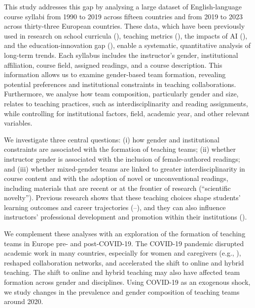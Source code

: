 \documentclass[
  british,
  12pt, %
]{article}
\begin{document}
This study addresses this gap by analysing a large dataset of English-language course syllabi from 1990 to 2019 across fifteen countries and from 2019 to 2023 across thirty-three European countries. These data, which have been previously used in research on school curricula (), teaching metrics (), the impacts of AI (), and the education-innovation gap (), enable a systematic, quantitative analysis of long-term trends. Each syllabus includes the instructor's gender, institutional affiliation, course field, assigned readings, and a course description. This information allows us to examine gender-based team formation, revealing potential preferences and institutional constraints in teaching collaborations. Furthermore, we analyse how team composition, particularly gender and size, relates to teaching practices, such as interdisciplinarity and reading assignments, while controlling for institutional factors, field, academic year, and other relevant variables.

We investigate three central questions: (i) how gender and institutional constraints are associated with the formation of teaching teams; (ii) whether instructor gender is associated with the inclusion of female-authored readings; and (iii) whether mixed-gender teams are linked to greater interdisciplinarity in course content and with the adoption of novel or unconventional readings, including materials that are recent or at the frontier of research (``scientific novelty''). Previous research shows that these teaching choices shape students' learning outcomes and career trajectories (--), and they can also influence instructors' professional development and promotion within their institutions ().

We complement these analyses with an exploration of the formation of teaching teams in Europe pre- and post-COVID-19. The COVID-19 pandemic disrupted academic work in many countries, especially for women and caregivers (e.g., ), reshaped collaboration networks, and accelerated the shift to online and hybrid teaching. The shift to online and hybrid teaching may also have affected team formation across gender and disciplines. Using COVID-19 as an exogenous shock, we study changes in the prevalence and gender composition of teaching teams around 2020.
\end{document}
